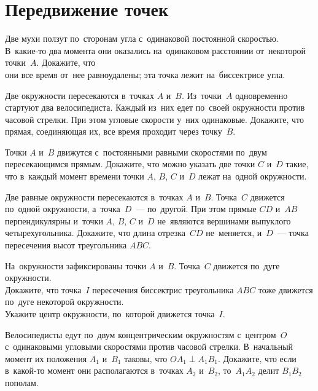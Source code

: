 
\section*{Передвижение точек}


\begin{problems}

\item
Две мухи ползут по~сторонам угла с~одинаковой постоянной скоростью.
В~какие-то два момента они оказались на~одинаковом расстоянии от~некоторой
точки~$A$.
Докажите, что
\\
\subproblem они все время от~нее равноудалены;
\qquad
\subproblem эта точка лежит на~биссектрисе угла.

\item
Две окружности пересекаются в~точках $A$ и~$B$.
Из~точки~$A$ одновременно стартуют два велосипедиста.
Каждый из~них едет по~своей окружности против часовой стрелки.
При этом угловые скорости у~них одинаковые.
Докажите, что прямая, соединяющая их, все время проходит через точку~$B$.

\item
Точки $A$ и~$B$ движутся с~постоянными равными скоростями по~двум
пересекающимся прямым.
Докажите, что можно указать две точки $C$ и~$D$ такие, что в~каждый момент
времени точки $A$, $B$, $C$ и~$D$ лежат на~одной окружности.

\item
Две равные окружности пересекаются в~точках $A$ и~$B$.
Точка~$C$ движется по~одной окружности, а~точка~$D$~--- по~другой.
При этом прямые $CD$ и~$AB$ перпендикулярны и~точки $A$, $B$, $C$ и~$D$
не~являются вершинами выпуклого четырехугольника.
Докажите, что длина отрезка~$CD$ не~меняется, и~$D$~--- точка пересечения высот
треугольника $ABC$.

\item
На~окружности зафиксированы точки $A$ и~$B$.
Точка~$C$ движется по~дуге окружности.
\\
\subproblem
Докажите, что точка~$I$ пересечения биссектрис треугольника $ABC$ тоже движется
по~дуге некоторой окружности.
\\
\subproblem
Укажите центр окружности, по~которой движется точка~$I$.

\item
Велосипедисты едут по~двум концентрическим окружностям с~центром~$O$
с~одинаковыми угловыми скоростями против часовой стрелки.
В~начальный момент их положения $A_1$  и~$B_1$ таковы, что
$O A_1 \perp A_1 B_1$.
Докажите, что если в~какой-то момент они располагаются в~точках $A_2$ и~$B_2$,
то~$A_1 A_2$ делит $B_1 B_2$ пополам.


\end{problems}

